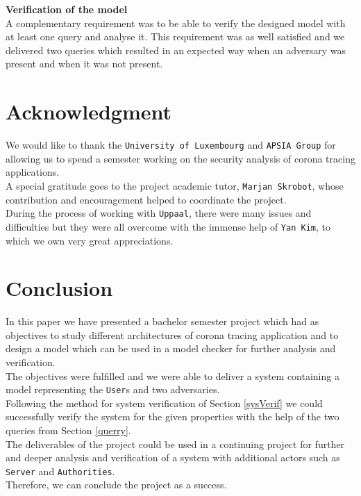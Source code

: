\documentclass[a4paper, twocolumn]{article}
\begin{document}
\noindent\textbf{Verification of the model}\\
A complementary requirement was to be able to verify the designed model with at least one query and analyse it. This requirement was as well satisfied and we delivered two queries which resulted in an expected way when an adversary was present and when it was not present.

\section*{Acknowledgment}
We would like to thank the \texttt{University of Luxembourg} and \texttt{APSIA Group} \cite{apsia} for allowing us to spend a semester working on the security analysis of corona tracing applications.\\
A special gratitude goes to the project academic tutor, \texttt{Marjan Skrobot}, whose contribution and encouragement helped to coordinate the project.\\
During the process of working with \texttt{Uppaal}, there were many issues and difficulties but they were all overcome with the immense help of \texttt{Yan Kim}, to which we own very great appreciations. 

\section{Conclusion}
In this paper we have presented a bachelor semester project which had as objectives to study different architectures of corona tracing application and to design a model which can be used in a model checker for further analysis and verification.\\
The objectives were fulfilled and we were able to deliver a system containing a model representing the \texttt{User}s and two adversaries.\\
Following the method for system verification of Section \ref{sysVerif} we could successfully verify the system for the given properties with the help of the two queries from Section \ref{querry}.\\
The deliverables of the project could be used in a continuing project for further and deeper analysis and verification of a system with additional actors such as \texttt{Server} and \texttt{Authorities}.\\
Therefore, we can conclude the project as a success.\\
\end{document}
